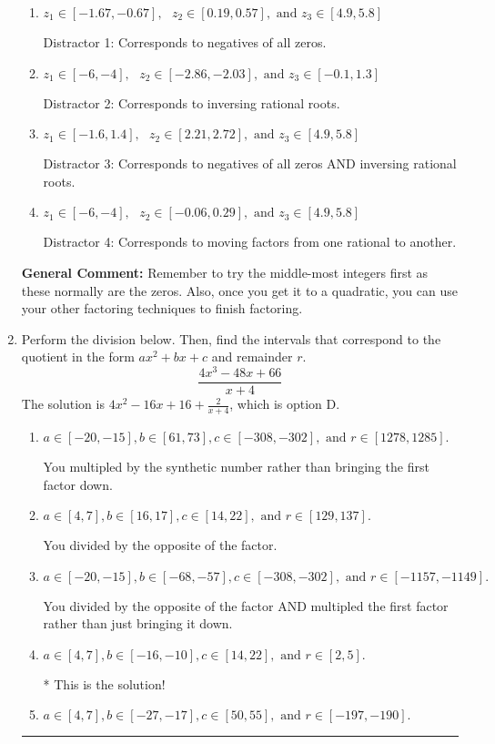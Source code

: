 \documentclass{extbook}[14pt]
\newcommand{\litem}[1]{\item #1

\rule{\textwidth}{0.4pt}}
\begin{document}
\begin{enumerate}
{\begin{enumerate}[label=\Alph*.]
* This is the solution!
\item \( z_1 \in [-1.67, -0.67], \text{   }  z_2 \in [0.19, 0.57], \text{   and   } z_3 \in [4.9, 5.8] \)

 Distractor 1: Corresponds to negatives of all zeros.
\item \( z_1 \in [-6, -4], \text{   }  z_2 \in [-2.86, -2.03], \text{   and   } z_3 \in [-0.1, 1.3] \)

 Distractor 2: Corresponds to inversing rational roots.
\item \( z_1 \in [-1.6, 1.4], \text{   }  z_2 \in [2.21, 2.72], \text{   and   } z_3 \in [4.9, 5.8] \)

 Distractor 3: Corresponds to negatives of all zeros AND inversing rational roots.
\item \( z_1 \in [-6, -4], \text{   }  z_2 \in [-0.06, 0.29], \text{   and   } z_3 \in [4.9, 5.8] \)

 Distractor 4: Corresponds to moving factors from one rational to another.
\end{enumerate}

\textbf{General Comment:} Remember to try the middle-most integers first as these normally are the zeros. Also, once you get it to a quadratic, you can use your other factoring techniques to finish factoring.
}
\litem{
Perform the division below. Then, find the intervals that correspond to the quotient in the form $ax^2+bx+c$ and remainder $r$.
\[ \frac{4x^{3} -48 x + 66}{x + 4} \]The solution is \( 4x^{2} -16 x + 16 + \frac{2}{x + 4} \), which is option D.\begin{enumerate}[label=\Alph*.]
\item \( a \in [-20, -15], b \in [61, 73], c \in [-308, -302], \text{ and } r \in [1278, 1285]. \)

 You multipled by the synthetic number rather than bringing the first factor down.
\item \( a \in [4, 7], b \in [16, 17], c \in [14, 22], \text{ and } r \in [129, 137]. \)

 You divided by the opposite of the factor.
\item \( a \in [-20, -15], b \in [-68, -57], c \in [-308, -302], \text{ and } r \in [-1157, -1149]. \)

 You divided by the opposite of the factor AND multipled the first factor rather than just bringing it down.
\item \( a \in [4, 7], b \in [-16, -10], c \in [14, 22], \text{ and } r \in [2, 5]. \)

* This is the solution!
\item \( a \in [4, 7], b \in [-27, -17], c \in [50, 55], \text{ and } r \in [-197, -190]. \)


\end{enumerate}}
\end{enumerate}
\end{document}

